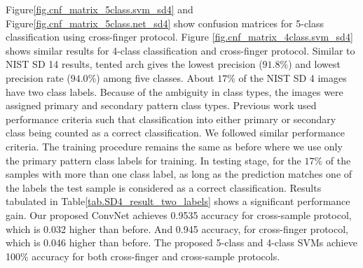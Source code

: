 Figure\ref{fig.cnf_matrix_5class.svm_sd4} and Figure\ref{fig.cnf_matrix_5class.net_sd4} show confusion matrices for 5-class classification using cross-finger protocol. Figure \ref{fig.cnf_matrix_4class.svm_sd4} shows similar results for 4-class classification and cross-finger protocol.
%
Similar to NIST SD 14 results, tented arch gives the lowest precision ($91.8\%$) and lowest precision rate ($94.0\%$) among five classes. 
%
About $17\%$ of the NIST SD 4 images have two class labels.  Because of the ambiguity in class types, the images were assigned  primary and secondary pattern class types. Previous work used performance criteria such that classification into either primary or secondary class being counted as a correct classification. We followed similar performance criteria.
%
%
%
%
The training procedure remains the same as before where we use only the primary pattern class labels for training. 
%
In testing stage, for the $17\%$ of the samples with more than one class label, as long as the prediction matches one of the labels the test sample is considered as a correct classification.  Results tabulated in Table\ref{tab.SD4_result_two_labels} shows a significant performance gain. 
Our proposed ConvNet achieves 0.9535 accuracy for cross-sample protocol, which is 0.032 higher than before.  And 0.945 accuracy, for cross-finger protocol, which is 0.046 higher than before.
%
The proposed 5-class and 4-class SVMs achieve 100\% accuracy for both cross-finger and cross-sample protocols.
%

%


